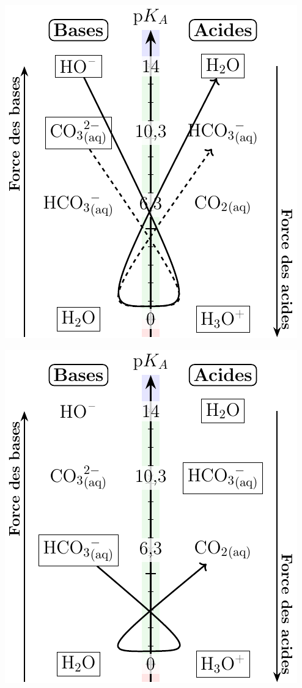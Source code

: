 \documentclass[../DS08.tex]{subfiles}%
\begin{document}
{\begin{minipage}[t]{.20\linewidth}
\begin{center}
			\includegraphics[width=\linewidth]{echpka_co2-a}
		\end{center}
	\end{minipage}
	\noindent
	\begin{minipage}[c]{.20\linewidth}
		\begin{center}
			\includegraphics[width=\linewidth]{echpka_co2-b}

\end{center}
\end{minipage}}
\end{document}
